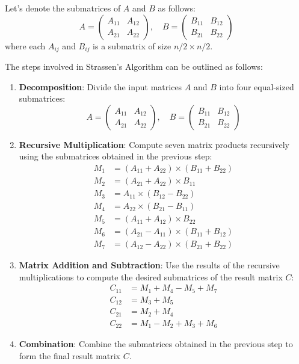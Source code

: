 \documentclass[12pt]{book} %
\begin{document}
Let's denote the submatrices of $A$ and $B$ as follows:
\[
A = \begin{pmatrix}
A_{11} & A_{12} \\
A_{21} & A_{22}
\end{pmatrix}, \quad
B = \begin{pmatrix}
B_{11} & B_{12} \\
B_{21} & B_{22}
\end{pmatrix}
\]
where each $A_{ij}$ and $B_{ij}$ is a submatrix of size $n/2 \times n/2$.

The steps involved in Strassen's Algorithm can be outlined as follows:

\begin{enumerate}
    \item \textbf{Decomposition}: Divide the input matrices $A$ and $B$ into four equal-sized submatrices:
    \[
    A = \begin{pmatrix}
    A_{11} & A_{12} \\
    A_{21} & A_{22}
    \end{pmatrix}, \quad
    B = \begin{pmatrix}
    B_{11} & B_{12} \\
    B_{21} & B_{22}
    \end{pmatrix}
    \]
    
    \item \textbf{Recursive Multiplication}: Compute seven matrix products recursively using the submatrices obtained in the previous step:
    \begin{align*}
        M_1 &= (A_{11} + A_{22}) \times (B_{11} + B_{22}) \\
        M_2 &= (A_{21} + A_{22}) \times B_{11} \\
        M_3 &= A_{11} \times (B_{12} - B_{22}) \\
        M_4 &= A_{22} \times (B_{21} - B_{11}) \\
        M_5 &= (A_{11} + A_{12}) \times B_{22} \\
        M_6 &= (A_{21} - A_{11}) \times (B_{11} + B_{12}) \\
        M_7 &= (A_{12} - A_{22}) \times (B_{21} + B_{22})
    \end{align*}
    
    \item \textbf{Matrix Addition and Subtraction}: Use the results of the recursive multiplications to compute the desired submatrices of the result matrix $C$:
    \begin{align*}
        C_{11} &= M_1 + M_4 - M_5 + M_7 \\
        C_{12} &= M_3 + M_5 \\
        C_{21} &= M_2 + M_4 \\
        C_{22} &= M_1 - M_2 + M_3 + M_6
    \end{align*}
    
    \item \textbf{Combination}: Combine the submatrices obtained in the previous step to form the final result matrix $C$.
\end{enumerate}
\end{document}

